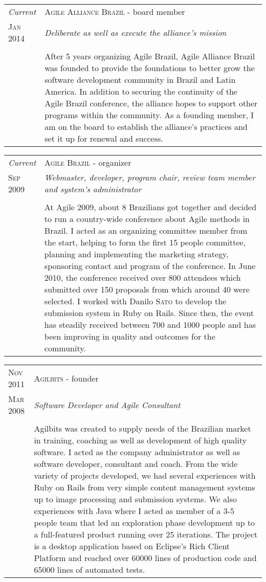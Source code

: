 \documentclass[letter,10pt]{article}
\begin{document}
\begin{tabular}{p{2.5cm}|p{13.5cm}}
  \emph{Current} & \textsc{Agile Alliance Brazil} - board member\\
  \textsc{Jan 2014}& \emph{Deliberate as well as execute the alliance's mission}\\
  &\\
  & After 5 years organizing Agile Brazil, Agile Alliance Brazil
  was founded to provide the foundations to better grow the software
  development community in Brazil and Latin America. In addition to
  securing the continuity of the Agile Brazil conference, the alliance
  hopes to support other programs within the community. As a founding
  member, I am on the board to establish the alliance's practices
  and set it up for renewal and success.
\end{tabular}

\begin{tabular}{p{2.5cm}|p{13.5cm}}
  \emph{Current} & \textsc{Agile Brazil} - organizer\\
  \textsc{Sep 2009}& \emph{Webmaster, developer, program chair, review team
    member and system's administrator}\\
  &\\
  &At Agile 2009, about 8 Brazilians got together and
  decided to run a country-wide conference about Agile methods in
  Brazil. I acted as an organizing committee member from the start,
  helping to form the first 15 people committee, planning and implementing
  the marketing strategy, sponsoring contact and program of the conference.
  In June 2010, the conference received over 800 attendees which
  submitted over 150 proposals from which around 40 were selected. I
  worked with Danilo \textsc{Sato} to develop the submission system
  in Ruby on Rails. Since then, the event has steadily received between 700
  and 1000 people and has been improving in quality and outcomes for the
  community.
\end{tabular}

\begin{tabular}{p{2.5cm}|p{13.5cm}}
  \textsc{Nov 2011} & \textsc{Agilbits} - founder\\
  \textsc{Mar 2008}& \emph{Software Developer and Agile Consultant}\\
  &\\
  &Agilbits was created
  to supply needs of the Brazilian market in training, coaching as
  well as development of high quality software. I acted as the
  company administrator as well as software developer, consultant
  and coach.
  From the wide variety of projects developed, we had several
  experiences with Ruby on Rails from very simple content management
  systems up to image processing and submission systems.
  We also experiences with Java where I acted as member of a 3-5
  people team that led an exploration phase development up to a
  full-featured product running over 25 iterations. The project is a
  desktop application based on Eclipse's Rich Client Platform and
  reached over 60000 lines of production code and 65000 lines of
  automated tests.
\end{tabular}
\end{document}
